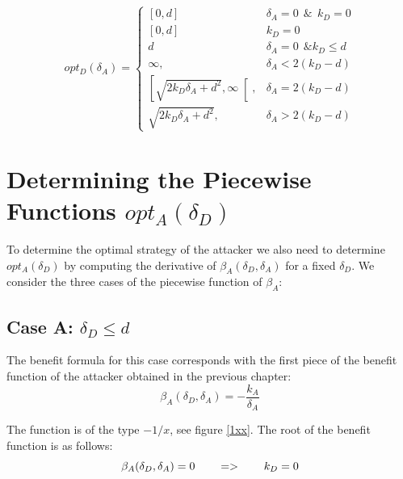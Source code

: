  \begin{displaymath}
  opt_{D}(\delta_{A}) = \left\{
     \begin{array}{lr}
     \left[0,d\right] & \delta_{A} =0 ~~\& ~~k_{D}=0 \\
     \left[0,d\right] & k_{D}=0\\
     d & \delta_{A} =0 ~~ \& k_{D} \leq d\\
          \infty , & \delta_{A} < 2(k_{D} - d)\\
      \left[ \sqrt{2k_{D}\delta_{A} + d^{2}},\infty\right[ , & \delta_{A} = 2(k_{D} - d) \\
      \sqrt{2k_{D}\delta_{A} + d^{2}}, & \delta_{A} > 2(k_{D} - d)
     \end{array}
   \right.
\end{displaymath}
%
%
\section{Determining the Piecewise Functions $opt_{A}(\delta_{D})$}
To determine the optimal strategy of the attacker we also need to determine $opt_{A}(\delta_{D})$ by computing the derivative of $\beta_{A}(\delta_{D},\delta_{A})$ for a fixed $\delta_{D}$. We consider the three cases of the piecewise function of $\beta_{A}$: \\


\subsection*{Case A: $\delta_{D} \leq d$}

The benefit formula for this case corresponds with the first piece of the benefit function of the attacker obtained in the previous chapter:
\begin{equation}
\beta_{A}(\delta_{D},\delta_{A}) =  - \dfrac{k_{A}}{\delta_{A}}
\end{equation}


The function is of the type $-1/x$, see figure \ref{1xx}. The root of the benefit function is as follows:
\begin{equation}
\beta_{A}(\delta_{D},\delta_{A}) =0  ~~~~~~ =>~~~~~~k_{D} = 0 \\
\end{equation}


